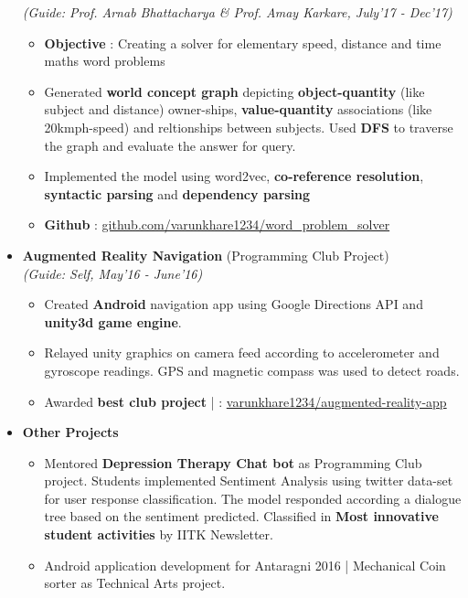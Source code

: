 \documentclass[a4paper,10pt]{article}
\newcommand{\isep}{-2 pt}
\begin{document}
\begin{itemize}
 \emph{(Guide: Prof. Arnab Bhattacharya \& Prof. Amay Karkare, July'17 - Dec'17)} \\[-0.6cm]
	\begin{itemize}\itemsep \isep
	\item \textbf{Objective} : Creating a solver for elementary speed, distance and time maths word problems 
	\item Generated \textbf{ world concept graph} depicting \textbf{object-quantity} (like subject and distance) owner-ships, \textbf{value-quantity} associations (like 20kmph-speed) and reltionships between subjects. Used \textbf{DFS} to traverse the graph and evaluate the answer for query.
	\item Implemented the model using word2vec, \textbf{co-reference resolution}, \textbf{syntactic parsing} and \textbf{dependency parsing}

	\item \textbf{Github} \faGithub  : \href{https://github.com/varunkhare1234/word_problem_solver }{github.com/varunkhare1234/word\_problem\_solver}
	\end{itemize}

\item \textbf{Augmented Reality Navigation} (Programming Club Project) \\
 \emph{(Guide: Self, May'16 - June'16)} \\[-0.6cm]
	\begin{itemize}\itemsep \isep
	\item Created \textbf{Android} navigation app using Google Directions API and \textbf{unity3d game engine}.
	\item Relayed unity graphics on camera feed according to accelerometer and gyroscope readings. GPS and magnetic compass was used to detect roads.
	\item Awarded \textbf{best club project} | \faGithub : \href{https://github.com/varunkhare1234/augmented-reality-app}{varunkhare1234/augmented-reality-app}
	\end{itemize}

\item\textbf{Other Projects}
    \begin{itemize}
    \item Mentored \textbf{Depression Therapy Chat bot} as Programming Club project. Students implemented Sentiment Analysis using twitter data-set for user response classification. The model responded according a dialogue tree based on the sentiment predicted. Classified in \textbf{Most innovative student activities} by IITK Newsletter.
    \item Android application development for Antaragni 2016 | Mechanical Coin sorter as Technical Arts project.
    \end{itemize}
\end{itemize}	
\end{document}
